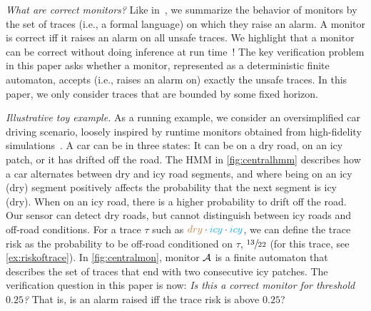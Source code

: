 \documentclass[runningheads]{llncs}
\newcommand{\icy}{{\color{cyan} icy}\xspace}
\newcommand{\dry}{{\color{brown} dry}\xspace}
\renewcommand{\paragraph}[1]{\smallskip\noindent\emph{#1}}
\begin{document}
\paragraph{What are correct monitors?}
Like in~\cite{acetoProbabilisticMonitorability2022}, we summarize the behavior of monitors by the    set of traces (i.e., a formal language) on which they raise an alarm. A monitor is correct iff it raises an alarm on all unsafe traces. We highlight that a monitor can be correct without doing inference at run time~\cite{cleavelandConservativeSafetyMonitors2023}! The key verification problem in this paper asks whether a monitor, represented as a deterministic finite automaton, accepts (i.e., raises an alarm on) exactly the unsafe traces. In this paper, we only consider traces that are bounded by some fixed horizon.

\paragraph{Illustrative toy example.}
As a running example, we consider an oversimplified car driving scenario, loosely inspired by runtime monitors obtained from high-fidelity simulations~\cite{DBLP:conf/atva/TorfahXJVS22}. A car can be in three states: It can be on a dry road, on an icy patch, or it has drifted off the road. The HMM in \cref{fig:centralhmm} describes how a car alternates between dry and icy road segments, and where being on an icy (dry) segment positively affects the probability that the next segment is icy (dry). When on an icy road, there is a higher probability to drift off the road. Our sensor can detect dry roads, but cannot distinguish between icy roads and off-road conditions. For a trace $\tau$ such as $\dry \cdot \icy \cdot \icy$, we can define the trace risk as the probability to be off-road conditioned on $\tau$, $\sfrac{13}{22}$ (for this trace, see \cref{ex:riskoftrace}).
In \cref{fig:centralmon}, monitor $\mathcal{A}$ is a finite automaton that describes the set of traces that end with two consecutive icy patches.
The verification question in this paper is now: \emph{Is this a correct monitor for threshold $0.25$?} That is, is an alarm raised iff the trace risk is above $0.25$?



\end{document}

